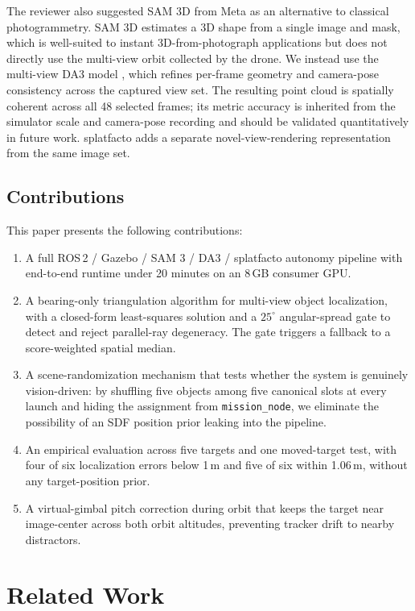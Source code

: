 \documentclass[conference]{IEEEtran}
\begin{document}
The reviewer also suggested SAM 3D from Meta as an alternative to
classical photogrammetry. SAM 3D estimates a 3D shape from a single
image and mask, which is well-suited to instant 3D-from-photograph
applications but does not directly use the multi-view orbit collected
by the drone. We instead use the multi-view DA3 model
\cite{lin2025da3}, which refines per-frame geometry and camera-pose
consistency across the captured view set. The resulting point cloud
is spatially coherent across all 48 selected frames; its metric
accuracy is inherited from the simulator scale and camera-pose
recording and should be validated quantitatively in future work.
splatfacto adds a separate novel-view-rendering representation from
the same image set.

\subsection{Contributions}

This paper presents the following contributions:
\begin{enumerate}
    \item A full ROS\,2 / Gazebo / SAM 3 / DA3 / splatfacto autonomy
    pipeline with end-to-end runtime under 20 minutes on an 8\,GB
    consumer GPU.
    \item A bearing-only triangulation algorithm for multi-view
    object localization, with a closed-form least-squares solution
    and a $25^{\circ}$ angular-spread gate to detect and reject
    parallel-ray degeneracy. The gate triggers a fallback to a
    score-weighted spatial median.
    \item A scene-randomization mechanism that tests whether the
    system is genuinely vision-driven: by shuffling five objects among
    five canonical slots at every launch and hiding the assignment
    from \texttt{mission\_node}, we eliminate the possibility of an
    SDF position prior leaking into the pipeline.
    \item An empirical evaluation across five targets and one moved-target
    test, with four of six localization errors below 1\,m and five
    of six within 1.06\,m, without any target-position prior.
    \item A virtual-gimbal pitch correction during orbit that
    keeps the target near image-center across both orbit
    altitudes, preventing tracker drift to nearby distractors.
\end{enumerate}

\section{Related Work}
\end{document}
